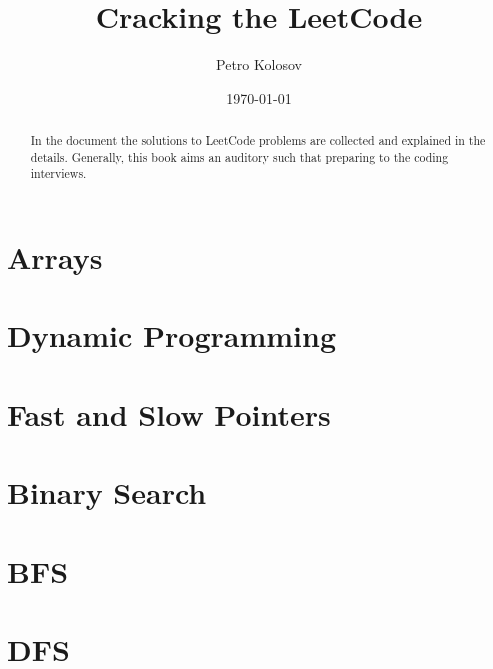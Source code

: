 \documentclass[12pt,letterpaper,oneside,reqno]{amsart}
\title[Cracking the LeetCode]{Cracking the LeetCode}
\author[Petro Kolosov]{Petro Kolosov}
\date{\today}
\begin{document}
    \begin{abstract}
        In the document the solutions to LeetCode problems are collected and explained in the details.
        Generally, this book aims an auditory such that preparing to the coding interviews.
    \end{abstract}
    \maketitle
    \tableofcontents


    \section{Arrays}\label{sec:arrays}
    
    


    \section{Dynamic Programming}\label{sec:dynamic-programming}


    \section{Fast and Slow Pointers}\label{sec:fast-and-slow-pointers}


    \section{Binary Search}\label{sec:binary-search}


    \section{BFS}\label{sec:bfs}


    \section{DFS}\label{sec:dfs}

    
    
\end{document}
